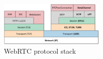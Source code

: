 \documentclass{sig-alternate}
\begin{document}



\begin{figure}[t]
  \centering
    \includegraphics[width=0.46\textwidth]{figs/architecture2}
\vspace*{-0.38cm}
	\caption{WebRTC protocol stack} \label{fig:architecture}
\vspace*{-0.4cm}
\end{figure}
\end{document}
